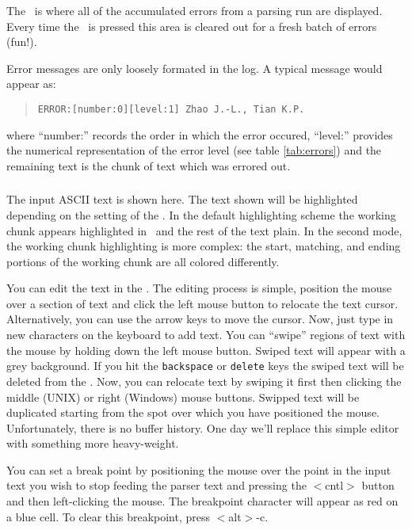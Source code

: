 The \errortextarea\ is where all of the accumulated errors
from a parsing run are displayed. Every time the \runbutton\ is pressed this
area is cleared out for a fresh batch of errors (fun!).

Error messages are only loosely formated in the log. A typical message
would appear as:
\begin{quote}
{\tt  ERROR:[number:0][level:1] Zhao J.-L., Tian K.P. }
\end{quote}
where ``number:'' records the order in which the error occured,
``level:'' provides the numerical representation of the error level
(see table \ref{tab:errors}) and the remaining text is the chunk of 
text which was errored out. 

\subsubsection{ }
\label{sec:inputtextarea}

The input ASCII text is shown here. The text shown will be 
highlighted depending on the setting of the 
\toggleinputchunkviewbutton . In the default highlighting scheme
the working chunk appears highlighted in \ and
the rest of the text plain. In the second mode, the working chunk highlighting
is more complex: the start, matching, and ending portions of the working chunk
are all colored differently.

You can edit the text in the  . The editing process is simple,
position the mouse over a section of text and click the left mouse button
to relocate the text cursor. Alternatively, you can use the arrow keys to 
move the cursor. Now, just type in new characters on the keyboard to add
text. You can ``swipe'' regions of text with the mouse by holding down the
left mouse button. Swiped text will appear with a grey background. If you 
hit the {\tt backspace} or {\tt delete} keys the swiped text will be deleted
from the  . Now, you can relocate text by swiping it first
then clicking the middle (UNIX) or right (Windows) mouse buttons. 
Swipped text will be duplicated starting from the spot over which you 
have positioned the mouse. 
Unfortunately, there is no buffer history. One day we'll replace this simple
editor with something more heavy-weight.

You can set a break point by positioning the mouse over the point in the  
input text you wish to stop feeding the parser text and pressing the 
$<$cntl$>$ button and then left-clicking the mouse.
The breakpoint character will appear as red on a blue cell. To clear this
breakpoint, press $<$alt$>$-c.

